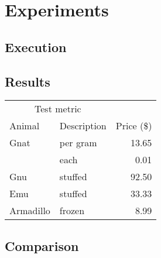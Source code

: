 
\chapter{Experiments}
\label{experiments}


\section{Execution}


\section{Results}
\begin{tabular}{@{}llr@{}} \toprule
    \multicolumn{2}{c}{Test metric} \\ \cmidrule(r){1-2}
    Animal & Description & Price (\$)\\ \midrule
    Gnat & per gram & 13.65 \\
         & each
    & 0.01 \\
    Gnu
    & stuffed
    & 92.50 \\
    Emu
    & stuffed
    & 33.33 \\
    Armadillo & frozen & 8.99 \\ \bottomrule
\end{tabular}

\section{Comparison}


